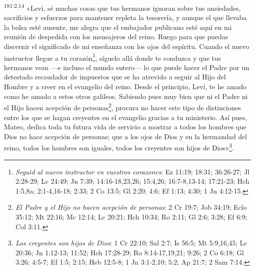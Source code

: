 \par 
\textsuperscript{181:2.14} «Leví, sé muchas cosas que tus hermanos ignoran sobre tus ansiedades, sacrificios y esfuerzos para mantener repleta la tesorería, y aunque el que llevaba la bolsa esté ausente, me alegra que el embajador publicano esté aquí en mi reunión de despedida con los mensajeros del reino. Ruego para que puedas discernir el significado de mi enseñanza con los ojos del espíritu. Cuando el nuevo instructor llegue a tu corazón\footnote{\textit{Seguid al nuevo instructor en vuestros corazones}: Ez 11:19; 18:31; 36:26-27; Jl 2:28-29; Lc 24:49; Jn 7:39; 14:16-18,23,26; 15:4,26; 16:7-8,13-14; 17:21-23; Hch 1:5,8a; 2:1-4,16-18; 2:33; 2 Co 13:5; Gl 2:20; 4:6; Ef 1:13; 4:30; 1 Jn 4:12-15.}, síguelo allá donde te conduzca y que tus hermanos vean ---e incluso el mundo entero--- lo que puede hacer el Padre por un detestado recaudador de impuestos que se ha atrevido a seguir al Hijo del Hombre y a creer en el evangelio del reino. Desde el principio, Leví, te he amado como he amado a estos otros galileos. Sabiendo pues muy bien que ni el Padre ni el Hijo hacen acepción de personas\footnote{\textit{El Padre y el Hijo no hacen acepción de personas}: 2 Cr 19:7; Job 34:19; Eclo 35:12; Mt 22:16; Mc 12:14; Lc 20:21; Hch 10:34; Ro 2:11; Gl 2:6; 3:28; Ef 6:9; Col 3:11.}, procura no hacer este tipo de distinciones entre los que se hagan creyentes en el evangelio gracias a tu ministerio. Así pues, Mateo, dedica toda tu futura vida de servicio a mostrar a todos los hombres que Dios no hace acepción de personas; que a los ojos de Dios y en la hermandad del reino, todos los hombres son iguales, todos los creyentes son hijos de Dios»\footnote{\textit{Los creyentes son hijos de Dios}: 1 Cr 22:10; Sal 2:7; Is 56:5; Mt 5:9,16,45; Lc 20:36; Jn 1:12-13; 11:52; Hch 17:28-29; Ro 8:14-17,19,21; 9:26; 2 Co 6:18; Gl 3:26; 4:5-7; Ef 1:5; 2:15; Heb 12:5-8; 1 Jn 3:1-2,10; 5:2; Ap 21:7; 2 Sam 7:14.}.

